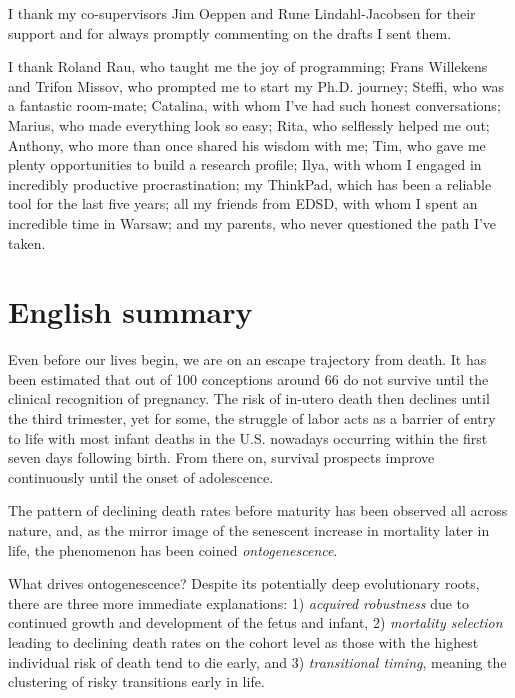 \documentclass[10pt, twoside]{book}
\begin{document}
I thank my co-supervisors Jim Oeppen and Rune Lindahl-Jacobsen for their support and for always promptly commenting on the drafts I sent them.

I thank Roland Rau, who taught me the joy of programming; Frans Willekens and Trifon Missov, who prompted me to start my Ph.D. journey; Steffi, who was a fantastic room-mate; Catalina, with whom I've had such honest conversations; Marius, who made everything look so easy; Rita, who selflessly helped me out; Anthony, who more than once shared his wisdom with me; Tim, who gave me plenty opportunities to build a research profile; Ilya, with whom I engaged in incredibly productive procrastination; my ThinkPad, which has been a reliable tool for the last five years; all my friends from EDSD, with whom I spent an incredible time in Warsaw; and my parents, who never questioned the path I've taken.

\clearpage


\section*{English summary}

Even before our lives begin, we are on an escape trajectory from death. It has been estimated that out of 100 conceptions around 66 do not survive until the clinical recognition of pregnancy. The risk of in-utero death then declines until the third trimester, yet for some, the struggle of labor acts as a barrier of entry to life with most infant deaths in the U.S. nowadays occurring within the first seven days following birth. From there on, survival prospects improve continuously until the onset of adolescence.

The pattern of declining death rates before maturity has been observed all across nature, and, as the mirror image of the senescent increase in mortality later in life, the phenomenon has been coined \emph{ontogenescence}.

What drives ontogenescence? Despite its potentially deep evolutionary roots, there are three more immediate explanations: 1) \emph{acquired robustness} due to continued growth and development of the fetus and infant, 2) \emph{mortality selection} leading to declining death rates on the cohort level as those with the highest individual risk of death tend to die early, and 3) \emph{transitional timing}, meaning the clustering of risky transitions early in life.
\end{document}

